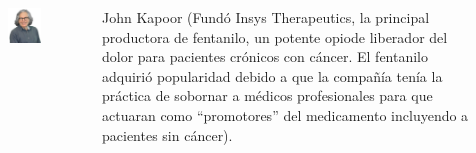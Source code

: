\documentclass[aspectratio=169]{beamer}
\begin{document}
\begin{frame}
\begin{columns}
\begin{column}{0.5\textwidth}
\begin{figure}
\includegraphics[width=.8\textwidth]{Kapoor.png}
\end{figure}   
\end{column}
\begin{column}{0.5\textwidth}
John Kapoor (Fundó Insys Therapeutics, la principal productora de fentanilo, un potente opiode liberador del dolor para pacientes crónicos con cáncer. El fentanilo adquirió popularidad debido a que la compañía tenía la práctica de sobornar a médicos profesionales para que actuaran como ``promotores'' del medicamento incluyendo a pacientes sin cáncer).
\end{column}
\end{columns}
\end{frame}
\end{document}
